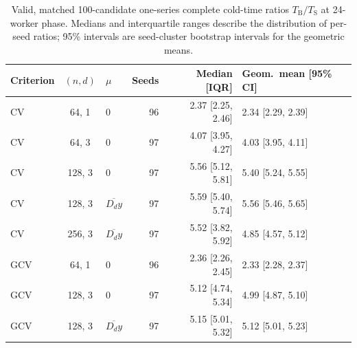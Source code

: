 \begin{table}[t]
\caption{Valid, matched 100-candidate one-series complete cold-time ratios $T_{\mathrm{B}}/T_{\mathrm{S}}$ at 24-worker phase. Medians and interquartile ranges describe the distribution of per-seed ratios; 95\% intervals are seed-cluster bootstrap intervals for the geometric means.}
\label{tab:empirical-paired}
\centering\scriptsize\setlength{\tabcolsep}{3.5pt}
\begin{tabular}{lclrrl}
\toprule
Criterion & $(n,d)$ & $\mu$ & Seeds & Median [IQR] & Geom.\ mean [95\% CI]\\
\midrule
CV & 64, 1 & $0$ & 96 & 2.37 [2.25, 2.46] & 2.34 [2.29, 2.39]\\
CV & 64, 3 & $0$ & 97 & 4.07 [3.95, 4.27] & 4.03 [3.95, 4.11]\\
CV & 128, 3 & $0$ & 97 & 5.56 [5.12, 5.81] & 5.40 [5.24, 5.55]\\
CV & 128, 3 & $\overline{D_dy}$ & 97 & 5.59 [5.40, 5.74] & 5.56 [5.46, 5.65]\\
CV & 256, 3 & $\overline{D_dy}$ & 97 & 5.52 [3.82, 5.92] & 4.85 [4.57, 5.12]\\
GCV & 64, 1 & $0$ & 96 & 2.36 [2.26, 2.45] & 2.33 [2.28, 2.37]\\
GCV & 128, 3 & $0$ & 97 & 5.12 [4.74, 5.34] & 4.99 [4.87, 5.10]\\
GCV & 128, 3 & $\overline{D_dy}$ & 97 & 5.15 [5.01, 5.32] & 5.12 [5.01, 5.23]\\
\bottomrule
\end{tabular}
\end{table}
